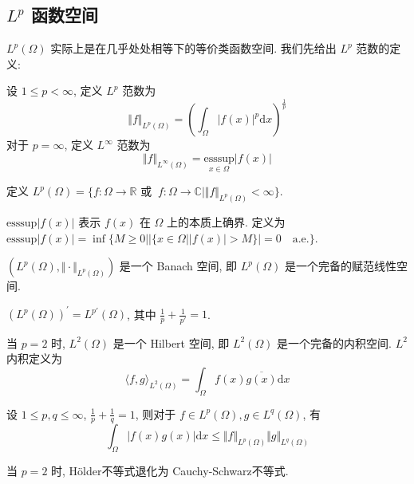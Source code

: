 \documentclass[11pt]{ctexart}[UTF8]
\begin{document}
\subsection{$L^p$ 函数空间}
$L^p(\Omega)$ 实际上是在几乎处处相等下的等价类函数空间. 我们先给出 $L^{p}$ 范数的定义:
\begin{definition}[$L^p$ 范数]
    设 $1 \leq p < \infty$, 定义 $L^p$ 范数为
\begin{equation*}
    \Vert f \Vert_{L^p(\Omega)} = \left( \int_{\Omega} |f(x)|^p \mathrm{d}x \right)^{\frac{1}{p}}
\end{equation*}
对于 $p = \infty$, 定义 $L^\infty$ 范数为
\begin{equation*}
    \Vert f \Vert_{L^\infty(\Omega)} = \underset{x \in \Omega}{\mathrm{esssup}} |f(x)|
\end{equation*}
\end{definition}
\begin{definition}[$L^p$ 函数空间]
    定义 $L^p(\Omega) = \{ f : \Omega \to \mathbb{R} \text{ 或 }\  f : \Omega \to \mathbb{C} | \Vert f \Vert_{L^p(\Omega)} < \infty \}$.
\end{definition}
\begin{remark}
    $\mathrm{esssup}|f(x)|$ 表示 $f(x)$ 在 $\Omega$ 上的本质上确界. 定义为 $\mathrm{esssup}|f(x)| = \inf \{ M \geq 0 | |\{ x \in \Omega | |f(x)| > M \}| = 0\quad \mathrm{a.e.} \}$.
\end{remark}
\begin{theorem}
    $\left( L^{p}(\Omega), \Vert \cdot \Vert_{L^p(\Omega)} \right)$ 是一个 Banach 空间, 即 $L^p(\Omega)$ 是一个完备的赋范线性空间.
\end{theorem}
\begin{theorem}
    $(L^{p}(\Omega))^{\prime} = L^{p'}(\Omega)$, 其中 $\frac{1}{p} + \frac{1}{p'} = 1$.
\end{theorem}
当 $p = 2$ 时, $L^2(\Omega)$ 是一个 Hilbert 空间, 即 $L^2(\Omega)$ 是一个完备的内积空间. $L^2$ 内积定义为
\begin{equation*}
    \langle f, g \rangle_{L^2(\Omega)} = \int_{\Omega} f(x) \overline{g(x)} \mathrm{d}x
\end{equation*}
\begin{theorem}[Hölder不等式]
    设 $1 \leq p, q \leq \infty$, $\frac{1}{p} + \frac{1}{q} = 1$, 则对于 $f \in L^p(\Omega), g \in L^q(\Omega)$, 有
\begin{equation*}
    \int_{\Omega} |f(x) g(x)| \mathrm{d}x \leq \Vert f \Vert_{L^p(\Omega)} \Vert g \Vert_{L^q(\Omega)}
\end{equation*}
\end{theorem}
\begin{remark}
    当 $p = 2$ 时, Hölder不等式退化为 Cauchy-Schwarz不等式.
\end{remark}
\end{document}
